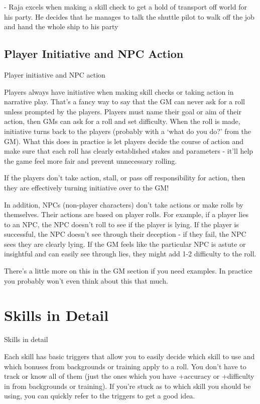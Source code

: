          - Raja excels when making a skill check to get a hold of transport off world for his party.
         He decides that he manages to talk the shuttle pilot to walk off the job and hand the
         whole ship to his party

\subsection{Player Initiative and NPC Action}
                                 Player initiative and NPC action


Players always have initiative when making skill checks or taking action in narrative play. That’s
a fancy way to say that the GM can never ask for a roll unless prompted by the players. Players
must name their goal or aim of their action, then GMs can ask for a roll and set difficulty. When
the roll is made, initiative turns back to the players (probably with a ‘what do you do?’ from the
GM). What this does in practice is let players decide the course of action and make sure that
each roll has clearly established stakes and parameters - it’ll help the game feel more fair and
prevent unnecessary rolling.


If the players don’t take action, stall, or pass off responsibility for action, then they are
effectively turning initiative over to the GM!


In addition, NPCs (non-player characters) don’t take actions or make rolls by themselves. Their
actions are based on player rolls. For example, if a player lies to an NPC, the NPC doesn’t roll to
see if the player is lying. If the player is successful, the NPC doesn’t see through their deception
- if they fail, the NPC sees they are clearly lying. If the GM feels like the particular NPC is astute
or insightful and can easily see through lies, they might add 1-2 difficulty to the roll.


There’s a little more on this in the GM section if you need examples. In practice you probably
won’t even think about this that much.

\section{Skills in Detail}
                                               Skills in detail


Each skill has basic triggers that allow you to easily decide which skill to use and which
bonuses from backgrounds or training apply to a roll. You don’t have to track or know all of
them (just the ones which you have +accuracy or +difficulty in from backgrounds or training). If
you’re stuck as to which skill you should be using, you can quickly refer to the triggers to get a
good idea.



